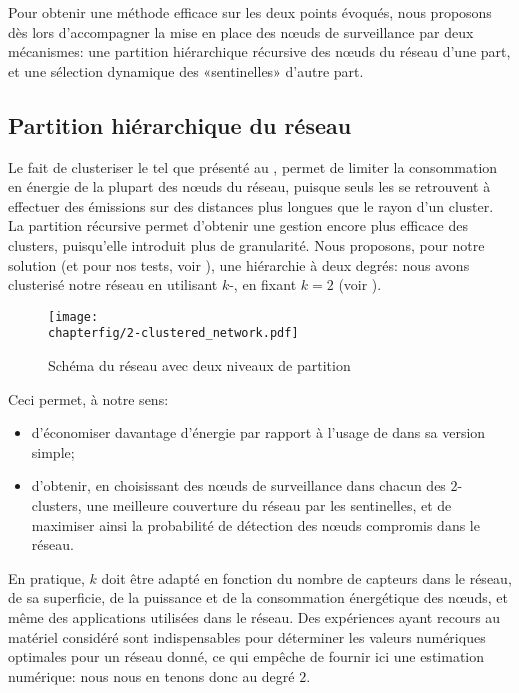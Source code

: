 Pour obtenir une méthode efficace sur les deux points évoqués, nous proposons dès lors d'accompagner la mise en place des nœuds de surveillance par deux mécanismes: une partition hiérarchique récursive des nœuds du réseau d'une part, et une sélection dynamique des «sentinelles» d'autre part.

    \subsection{Partition hiérarchique du réseau}

Le fait de clusteriser le \rc tel que présenté au ,  permet de limiter la consommation en énergie de la plupart des nœuds du réseau, puisque seuls les \chs se retrouvent à effectuer des émissions sur des distances plus longues que le rayon d'un cluster.
La partition récursive permet d'obtenir une gestion encore plus efficace des clusters, puisqu'elle introduit plus de granularité.
Nous proposons, pour notre solution (et pour nos tests, voir ), une hiérarchie à deux degrés: nous avons clusterisé notre réseau en utilisant $k$-\leach, en fixant $k=2$ (voir ).
\begin{figure}[ht]
    \centering
    \texttt{[image: \\chapterfig/2-clustered\_network.pdf]}
    \caption{Schéma du réseau avec deux niveaux de partition}\label{sa:fig:network}
\end{figure}
Ceci permet, à notre sens:
\begin{itemize}
    \item d'économiser davantage d'énergie par rapport à l'usage de \leach dans sa version simple;
    \item d'obtenir, en choisissant des nœuds de surveillance dans chacun des $2$-clusters, une meilleure couverture du réseau par les sentinelles, et de maximiser ainsi la probabilité de détection des nœuds compromis dans le réseau.
\end{itemize}
En pratique, $k$ doit être adapté en fonction du nombre de capteurs dans le réseau, de sa superficie, de la puissance et de la consommation énergétique des nœuds, et même des applications utilisées dans le réseau.
Des expériences ayant recours au matériel considéré sont indispensables pour déterminer les valeurs numériques optimales pour un réseau donné, ce qui empêche de fournir ici une estimation numérique: nous nous en tenons donc au degré $2$.

